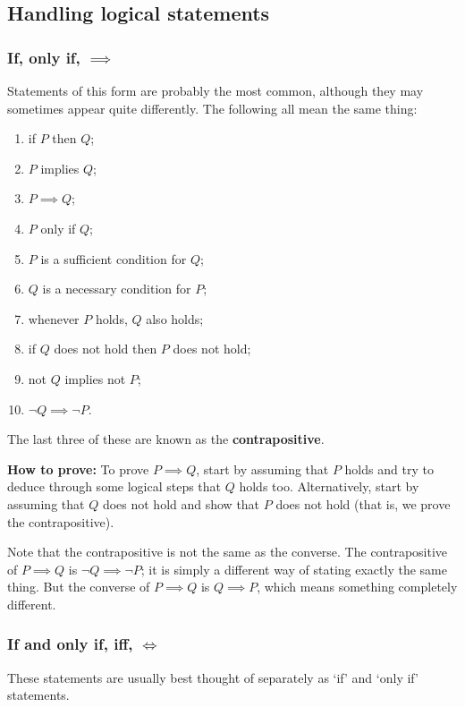 \subsection{Handling logical statements}
\subsubsection{If, only if, $\implies$}
Statements of this form are probably the most common, although they may sometimes appear quite differently. The following all mean the same thing:
\begin{enumerate}[label=(\roman*)]
\item if $P$ then $Q$;
\item $P$ implies $Q$;
\item $P \implies Q$;
\item $P$ only if $Q$;
\item $P$ is a sufficient condition for $Q$;
\item $Q$ is a necessary condition for $P$;
\item whenever $P$ holds, $Q$ also holds;
\item if $Q$ does not hold then $P$ does not hold;
\item not $Q$ implies not $P$;
\item $\lnot Q \implies \lnot P$.
\end{enumerate}

The last three of these are known as the \textbf{contrapositive}.

\textbf{How to prove:} To prove $P \implies Q$, start by assuming that $P$ holds and try to deduce through some logical steps that $Q$ holds too. Alternatively, start by assuming that $Q$ does not hold and show that $P$ does not hold (that is, we prove the contrapositive).

\begin{remark}
Note that the contrapositive is not the same as the converse. The contrapositive of $P \implies Q$ is $\lnot Q \implies \lnot P$; it is simply a different way of stating exactly the same thing. But the converse of $P \implies Q$ is $Q \implies P$, which means something completely different.
\end{remark}

\subsubsection{If and only if, iff, $\iff$}
These statements are usually best thought of separately as ‘if’ and ‘only if’ statements.

